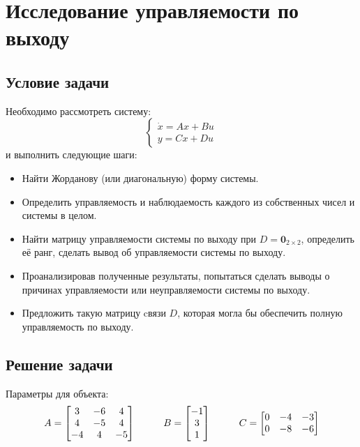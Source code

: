 \chapter{Исследование управляемости по выходу}
\label{ch:chap5}
\section{Условие задачи}

Необходимо рассмотреть систему:
$$
  \begin{cases}
    \dot{x} = Ax + Bu \\
    y = Cx + Du
  \end{cases}
$$ и выполнить следующие шаги:

\begin{itemize}
    \item Найти Жорданову (или диагональную) форму системы.
    \item Определить управляемость и наблюдаемость каждого из собственных чисел и системы в целом.
    \item Найти матрицу управляемости системы по выходу при $D = \mathbf{0}_{2×2}$, определить её
    ранг, сделать вывод об управляемости системы по выходу.
    \item Проанализировав полученные результаты, попытаться сделать выводы о причинах 
    управляемости или неуправляемости системы по выходу.
    \item Предложить такую матрицу cвязи $D$, которая могла бы обеспечить 
    полную управляемость по выходу.
\end{itemize}

\section{Решение задачи}

Параметры для объекта:
$$
  A = \begin{bmatrix}
  3 & -6 & 4 \\
  4 & -5 & 4 \\
  -4 & 4 & -5 
  \end{bmatrix} \hspace*{1cm}
  B = \begin{bmatrix}
    -1 \\ 3 \\ 1 
  \end{bmatrix} \hspace*{1cm}
  C = \begin{bmatrix}
    0 & -4 & -3 \\
    0 & -8 & -6
  \end{bmatrix}
$$

